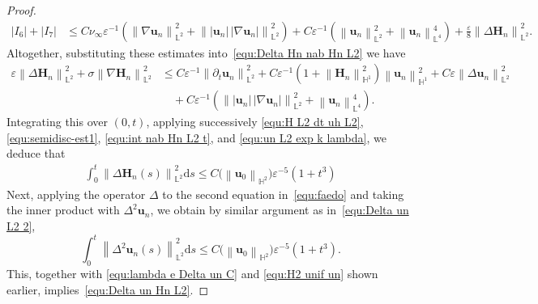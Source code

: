 \documentclass[11pt, reqno]{amsart}
\theoremstyle{definition}
\numberwithin{equation}{section}
\newcommand{\bff}{\boldsymbol}
\newcommand{\bb}{\mathbb}
\newcommand{\ds}{\mathrm{d}s}
\newcommand{\bl}[1]{{\color{blue}{#1}}}
\newcommand{\norm}[2]{\left\|{#1}\right\|_{#2}}
\newcommand{\inpro}[2]{\left\langle#1,#2\right\rangle}
\newcommand{\abs}[1]{\left|{#1}\right|}
\begin{document}
\begin{proof}
\begin{align*}
		\abs{I_6}+ \abs{I_7}
		&\leq
		C\nu_\infty \varepsilon^{-1}
		\left( \norm{\nabla \bff{u}_n}{\bb{L}^2}^2
		+
		\norm{|\bff{u}_n|\, |\nabla \bff{u}_n|}{\bb{L}^2}^2 \right)
		+
		C\varepsilon^{-1} \left(\norm{\bff{u}_n}{\bb{L}^2}^2 + \norm{\bff{u}_n}{\bb{L}^4}^4\right)
		+
		\frac{\varepsilon}{8} \norm{\Delta \bff{H}_n}{\bb{L}^2}^2.
	\end{align*}
	Altogether, substituting these estimates into~\eqref{equ:Delta Hn nab Hn L2} we have
    \begin{align}\label{equ:eps norm Delta Hn}
        \varepsilon\norm{\Delta \bff{H}_n}{\bb{L}^2}^2 
        + \sigma \norm{\nabla\bff{H}_n}{\bb{L}^2}^2
        &\leq
        C\varepsilon^{-1} \norm{\partial_t \bff{u}_n}{\bb{L}^2}^2
		+
        C\varepsilon^{-1} \left(1+ \norm{\bff{H}_n}{\bb{H}^1}^2 \right) \norm{\bff{u}_n}{\bb{H}^1}^2
        +
		C\varepsilon \norm{\Delta \bff{u}_n}{\bb{L}^2}^2
        \nonumber\\
        &\quad
        +
        C \varepsilon^{-1}
		\left(
		\norm{|\bff{u}_n|\, |\nabla \bff{u}_n|}{\bb{L}^2}^2
		+ \norm{\bff{u}_n}{\bb{L}^4}^4\right).
    \end{align}
    Integrating this over $(0,t)$, applying successively \eqref{equ:H L2 dt uh L2}, \eqref{equ:semidisc-est1}, \eqref{equ:int nab Hn L2 t}, and \eqref{equ:un L2 exp k lambda}, we deduce that
	\begin{align}\label{equ:lambda e Hn L2}
		\int_0^t \norm{\Delta \bff{H}_n(s)}{\bb{L}^2}^2 \ds
		\leq 
		C\big(\norm{\bff{u}_0}{\bb{H}^2}\big) \varepsilon^{-5}  \left(1+t^3\right)
	\end{align}
	Next, applying the operator $\Delta$ to the second equation in~\eqref{equ:faedo} and taking the inner product with $\Delta^2 \bff{u}_n$, we obtain by similar argument as in~\eqref{equ:Delta un L2 2},
	\begin{equation}\label{equ:int Delta2 CT}
		\int_0^t \norm{\Delta^2 \bff{u}_n(s)}{\bb{L}^2}^2 \ds 
        \leq 
        C\big(\norm{\bff{u}_0}{\bb{H}^2}\big) \varepsilon^{-5}  \left(1+t^3\right).
	\end{equation}
	This, together with \eqref{equ:lambda e Delta un C} and \eqref{equ:H2 unif un} shown earlier, implies~\eqref{equ:Delta un Hn L2}.

\end{proof}
\end{document}
